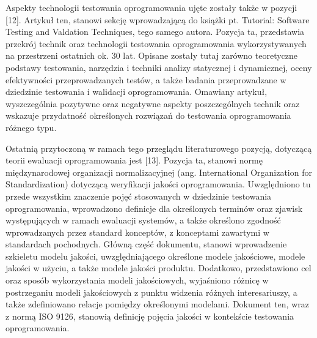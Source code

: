 Aspekty technologii testowania oprogramowania ujęte zostały także w pozycji [12]. Artykuł ten, stanowi sekcję wprowadzającą do książki pt. Tutorial: Software Testing and Valdation Techniques, tego samego autora. Pozycja ta, przedstawia przekrój technik oraz technologii testowania oprogramowania wykorzystywanych na przestrzeni ostatnich ok. 30 lat. Opisane zostały tutaj zarówno teoretyczne podstawy testowania, narzędzia i techniki analizy statycznej i dynamicznej, oceny efektywności przeprowadzanych testów, a także badania przeprowadzane w dziedzinie testowania i walidacji oprogramowania. Omawiany artykuł, wyszczególnia pozytywne oraz negatywne aspekty poszczególnych technik oraz wskazuje przydatność określonych rozwiązań do testowania oprogramowania różnego typu.

Ostatnią przytoczoną w ramach tego przeglądu literaturowego pozycją, dotyczącą teorii ewaluacji oprogramowania jest [13]. Pozycja ta, stanowi normę międzynarodowej organizacji normalizacyjnej (ang. International Organization for Standardization) dotyczącą weryfikacji jakości oprogramowania. Uwzględniono tu przede wszystkim znaczenie pojęć stosowanych w dziedzinie testowania oprogramowania, wprowadzono definicje dla określonych terminów oraz zjawisk występujących w ramach ewaluacji systemów, a także określono zgodność wprowadzanych przez standard konceptów, z konceptami zawartymi w standardach pochodnych. Główną część dokumentu, stanowi wprowadzenie szkieletu modelu jakości, uwzględniającego określone modele jakościowe, modele jakości w użyciu, a także modele jakości produktu. Dodatkowo, przedstawiono cel oraz sposób wykorzystania modeli jakościowych, wyjaśniono różnicę w postrzeganiu modeli jakościowych z punktu widzenia różnych interesariuszy, a także zdefiniowano relacje pomiędzy określonymi modelami. Dokument ten, wraz z normą ISO 9126, stanowią definicję pojęcia jakości w kontekście testowania oprogramowania.

